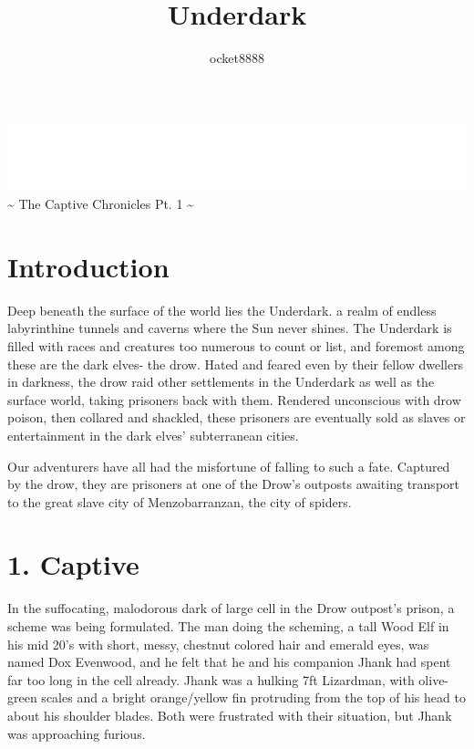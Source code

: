 \documentclass[letterpaper,10pt,twoside,twocolumn,openany]{book}
\title{Underdark}
\author{ocket8888}
\newcommand\BackgroundPic{%
\put(0,0){%
\parbox[b][\paperheight]{\paperwidth}{%
\vfill
\centering
\texttt{[image: underdark.jpg]}%
\vfill
}}}
\begin{document}
\AddToShipoutPicture*{\BackgroundPic}
\begin{titlepage}
\centering
\includegraphics[width=0.5\paperwidth,keepaspectratio]{img/title.pdf}\\
{\Large \color{white} \textasciitilde{} The Captive Chronicles Pt. 1 \textasciitilde}
\end{titlepage}

\chapter*{Introduction}
Deep beneath the surface of the world lies the Underdark. a realm of endless labyrinthine tunnels and caverns where the Sun never shines. The Underdark is filled with races and creatures too numerous to count or list, and foremost among these are the dark elves- the drow. Hated and feared even by their fellow dwellers in darkness, the drow raid other settlements in the Underdark as well as the surface world, taking prisoners back with them. Rendered unconscious with drow poison, then collared and shackled, these prisoners are eventually sold as slaves or entertainment in the dark elves' subterranean cities. 

Our adventurers have all had the misfortune of falling to such a fate. Captured by the drow, they are prisoners at one of the Drow's outposts awaiting transport to the great slave city of Menzobarranzan, the city of spiders.

\chapter{1. Captive}
In the suffocating, malodorous dark of large cell in the Drow outpost's prison, a scheme was being formulated. The man doing the scheming, a tall Wood Elf in his mid 20's with short, messy, chestnut colored hair and emerald eyes, was named Dox Evenwood, and he felt that he and his companion Jhank had spent far too long in the cell already. Jhank was a hulking 7ft Lizardman, with olive-green scales and a bright orange/yellow fin protruding from the top of his head to about his shoulder blades. Both were frustrated with their situation, but Jhank was approaching furious.\\
\end{document}
